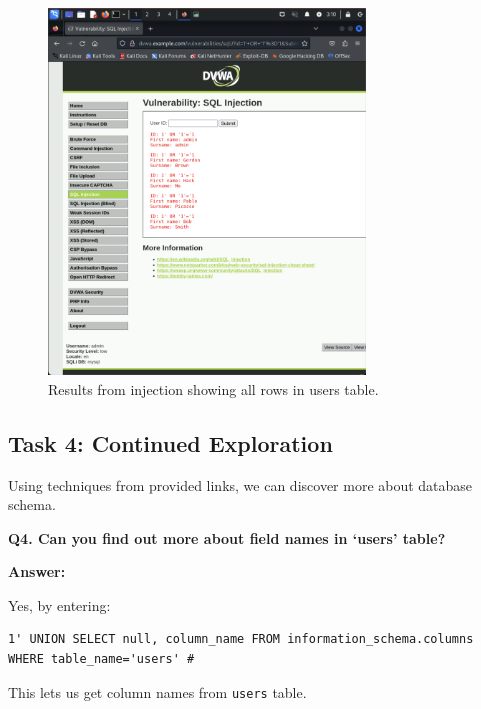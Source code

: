 \documentclass[12pt]{article}
\begin{document}
\begin{figure}[H]
    \centering
    \includegraphics[width=0.75\textwidth]{Screenshot2.png}
    \caption{Results from injection showing all rows in users table.}
\end{figure}

\subsection{Task 4: Continued Exploration}

Using techniques from provided links, we can discover more about database schema.

\textbf{Q4. Can you find out more about field names in ‘users’ table?}

\textbf{Answer:}

Yes, by entering:

\begin{lstlisting}
1' UNION SELECT null, column_name FROM information_schema.columns WHERE table_name='users' #
\end{lstlisting}

This lets us get column names from \texttt{users} table.
\end{document}
